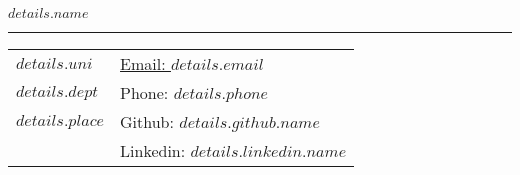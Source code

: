 \documentclass[letterpaper,11pt,oneside]{article}
\begin{document}
\noindent  \LARGE{\textbf{$details.name$}} \\
\vspace{-2ex} 
\hrule 
\normalsize

\begin{center}
\begin{tabular}{l l}
  $details.uni$   & \hspace{0.95in} \href{mailto:$details.email$}{Email: $details.email$} \\
  $details.dept$  & \hspace{1in}Phone: $details.phone$ \\
  $details.place$ & \hspace{1in}Github: $details.github.name$ \\
  & \hspace{1in}Linkedin: $details.linkedin.name$
\end{tabular}
\end{center}

\vspace{1em}

\end{document}
